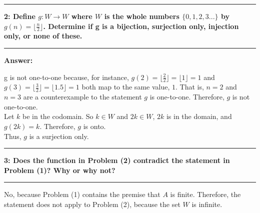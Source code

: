 \documentclass[11pt]{article}
\newcommand\question[2]{\vspace{.25in}\hrule\textbf{#1: #2}\vspace{.5em}\hrule\vspace{.10in}}
\newcommand\answer{\vspace{.10in}\textbf{Answer: }}
\begin{document}
\raggedright
\newcommand\NAME{Stewart Dulaney}  %
\newcommand\SID{1545566}     %
\newcommand\HWNUM{5}              %

\question{2}{Define $g: W \rightarrow W$ where $W$ is the whole numbers $\{0, 1, 2, 3...\}$ by $g(n) = \lfloor \frac{n}{2} \rfloor$. Determine if g is a bijection, surjection only, injection only, or none of these.}

\answer

g is not one-to-one because, for instance, $g(2) = \lfloor \frac{2}{2} \rfloor = \lfloor 1 \rfloor = 1$ and $g(3) = \lfloor \frac{3}{2} \rfloor = \lfloor 1.5 \rfloor = 1$ both map to the same value, $1$. That is, $n = 2$ and $n = 3$ are a counterexample to the statement $g$ is one-to-one. Therefore, $g$ is not one-to-one.\\[\baselineskip]

Let $k$ be in the codomain. So $k \in W$ and $2k \in W$, $2k$ is in the domain, and $g(2k) = k$. Therefore, $g$ is onto.\\[\baselineskip]

Thus, $g$ is a surjection only.\\[\baselineskip]

\question{3}{Does the function in Problem (2) contradict the statement in Problem (1)? Why or why not?}

No, because Problem (1) contains the premise that $A$ is finite. Therefore, the statement does not apply to Problem (2), because the set $W$ is infinite.
\end{document}
